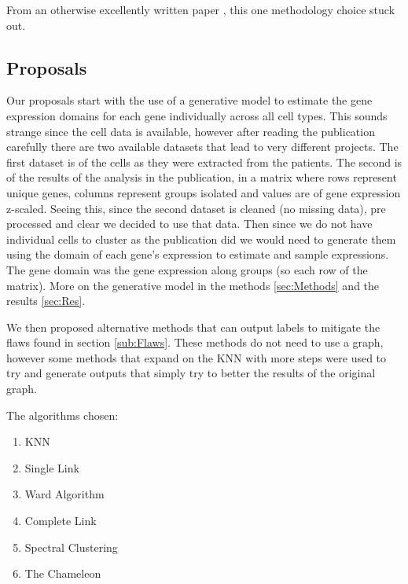 \documentclass[12pt, a4paper]{article}
\begin{document}
\begin{multicols}{2}
            From an otherwise excellently written paper \cite{pellin_comprehensive_2019}, this one methodology choice stuck out.
            \newline


            \subsection{Proposals} \label{sub:Prop}

            Our proposals start with the use of a generative model to estimate the gene expression domains for each gene individually across all cell types. This sounds strange since the cell data is available, however after reading the publication carefully there are two available datasets that lead to very different projects. The first dataset is of the cells as they were extracted from the patients. The second is of the results of the analysis in the publication, in a matrix where rows represent unique genes, columns represent groups isolated and values are of gene expression z-scaled. Seeing this, since the second dataset is cleaned (no missing data), pre processed and clear we decided to use that data. Then since we do not have individual cells to cluster as the publication did we would need to generate them using the domain of each gene's expression to estimate and sample expressions. The gene domain was the gene expression along groups (so each row of the matrix). More on the generative model in the methods \ref{sec:Methods} and the results \ref{sec:Res}.
            \newline

            We then proposed alternative methods that can output labels to mitigate the flaws found in section \ref{sub:Flaws}. These methods do not need to use a graph, however some methods that expand on the KNN with more steps were used to try and generate outputs that simply try to better the results of the original graph.
            \newline

            The algorithms chosen:

            \begin{enumerate}
                \item KNN
                \item Single Link
                \item Ward Algorithm
                \item Complete Link
                \item Spectral Clustering
                \item The Chameleon
            \end{enumerate}


\end{multicols}
\end{document}
